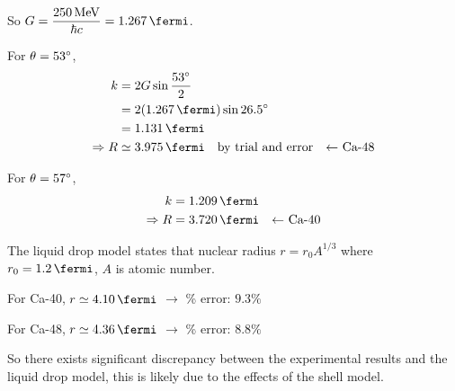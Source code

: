 \begin{parts}
\begin{subparts}
		So $G=\dfrac{\SI{250}{\mega\electronvolt}}{\hbar c}=\SI{1.267}{\per\fermi}$.
		
		For $\theta = 53\degree$,
		\begin{align*}
			k &= 2G \sin \frac{53\degree}{2} \\
			&= 2(\SI{1.267}{\per\fermi}) \sin 26.5\degree \\
			&= \SI{1.131}{\per\fermi} \\
			\Rightarrow R &\simeq \SI{3.975}{\fermi} \mtext{by trial and error\hspace{1em}$\leftarrow$ Ca-48}
		\end{align*}
		
		For $\theta = 57\degree$,
		\begin{align*}
			k &= \SI{1.209}{\per\fermi} \\
			\Rightarrow R &= \SI{3.720}{\fermi} \mtext{$\leftarrow$ Ca-40}
		\end{align*}
		
		\subpart The liquid drop model states that nuclear radius $r = r_0 A^{1/3}$ where $r_0 = \SI{1.2}{\fermi}$, $A$ is atomic number.
		
		For Ca-40, $r \simeq \SI{4.10}{\fermi}$ $\rightarrow$ \% error: $9.3\%$
		
		For Ca-48, $r \simeq \SI{4.36}{\fermi}$ $\rightarrow$ \% error: $8.8\%$
		
		So there exists significant discrepancy between the experimental results and the liquid drop model, this is likely due to the effects of the shell model.
	\end{subparts}
\end{parts}